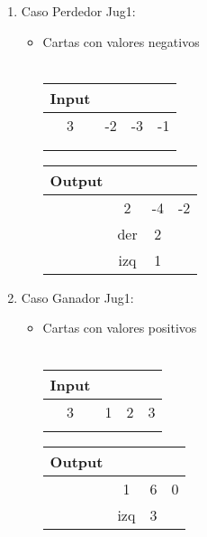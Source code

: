 \documentclass[11pt, a4paper, twoside]{article}
\begin{document}
\begin{enumerate}
  \item Caso Perdedor Jug1: 
    \begin{itemize}
      \item Cartas con valores negativos \\
      \\
        \begin{minipage}{0.4\textwidth}
            \begin{tabular}{cccc}
               Input \\
                           \hline
               3 & -2 & -3 & -1 \\
               \\
               \\
            \end{tabular}
        \end{minipage} 
        \begin{minipage}{0.3\textwidth}
            \begin{tabular}{cccc}
              Output\\
                \hline
               & 2   & -4  & -2 \\
               & der & 2  & \\
               & izq & 1  & \\
            \end{tabular}
        \end{minipage} 
    \end{itemize}

  \item Caso Ganador Jug1: 
  
    \begin{itemize}
      \item Cartas con valores positivos \\
      \\
        \begin{minipage}{0.4\textwidth}
            \begin{tabular}{cccc}
               Input \\
                           \hline   
               3 & 1 & 2 & 3 \\
               \\
            \end{tabular}
        \end{minipage} 
        \begin{minipage}{0.3\textwidth}
            \begin{tabular}{cccc}
              Output\\
                          \hline
                       & 1   & 6  & 0 \\
               & izq & 3  & \\
            \end{tabular}
        \end{minipage} 
        

\end{itemize}
\end{enumerate}
\end{document}
